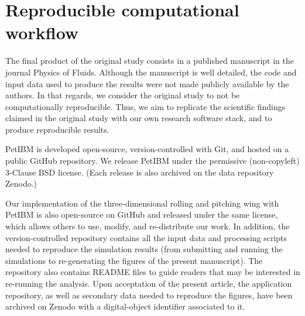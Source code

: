 \section{Reproducible computational workflow}

The final product of the original study consists in a published manuscript in the journal Physics of Fluids.
Although the manuscript is well detailed, the code and input data used to produce the results were not made publicly available by the authors.
In that regards, we consider the original study to not be computationally reproducible.
Thus, we aim to replicate the scientific findings claimed in the original study with our own research software stack, and to produce reproducible results.

PetIBM\supercite{chuang_et_al_2018} is developed open-source, version-controlled with Git, and hosted on a public GitHub repository.
We release PetIBM under the permissive (non-copyleft) 3-Clause BSD license.
(Each release is also archived on the data repository Zenodo.)

Our implementation of the three-dimensional rolling and pitching wing with PetIBM is also open-source on GitHub and released under the same license, which allows others to use, modify, and re-distribute our work.
In addition, the version-controlled repository contains all the input data and processing scripts needed to reproduce the simulation results (from submitting and running the simulations to re-generating the figures of the present manuscript).
The repository also contains \textsc{README} files to guide readers that may be interested in re-running the analysis.
Upon acceptation of the present article, the application repository, as well as secondary data needed to reproduce the figures, have been archived on Zenodo with a digital-object identifier associated to it.


